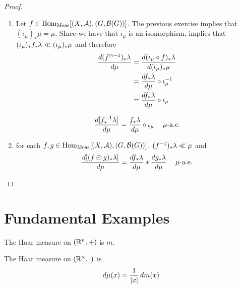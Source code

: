 \documentclass{book}
\begin{document}
	\begin{proof}\
		\begin{enumerate}
			\item Let $f \in \operatorname{Hom}_{\operatorname{\text{Meas}}}[(X, \mathcal{A}), (G, \mathcal{B}(G))]$. The previous exercise implies that $(\iota_{\mu})_* \mu = \mu$. SInce we have that $\iota_{\mu}$ is an isomorphism,  implies that $(\iota_{\mu})_* f_*\lambda \ll (\iota_{\mu})_*\mu$ and therefore
			\begin{align*}
				\frac{d (f^{\odot -1})_*\lambda}{d \mu}
				& = \frac{d (\iota_{\mu} \circ f)_*\lambda}{d (\iota_{\mu})_*\mu} \\
				& = \frac{d f_*\lambda}{d \mu} \circ \iota_{\mu}^{-1} \\
				& = \frac{d f_*\lambda}{d \mu} \circ \iota_{\mu} \\
			\end{align*}

			$$\frac{d [f^{-1}_*\lambda]}{d \mu} = \frac{f_*\lambda }{d\mu} \circ \iota_{\mu} \text{ \hspace{.2cm} $\mu$-a.e.}$$ 
			\item for each $f,g \in \operatorname{Hom}_{\operatorname{\text{Meas}}}[(X, \mathcal{A}), (G, \mathcal{B}(G))]$, $(f^{-1})_*\lambda \ll \mu$ and 
			$$\frac{d [(f \odot g)_*\lambda]}{d \mu} = \frac{d f_*\lambda }{d\mu} * \frac{d g_*\lambda }{d\mu} \text{ \hspace{.2cm} $\mu$-a.e.}$$ 
		\end{enumerate} 
	\end{proof}




	
	



	
	
	
	
	
	
	
	\newpage
	\section{Fundamental Examples}		
	
	\begin{note}
		The Haar measure on  $(\mathbb{R}^n, +)$ is $m$.
	\end{note}
	
	\begin{ex}  
		The Haar measure on $(\mathbb{R}^{\times}, \cdot)$  is $$d\mu(x) = \frac{1}{|x|} \, d m(x)$$
	\end{ex}
\end{document}
